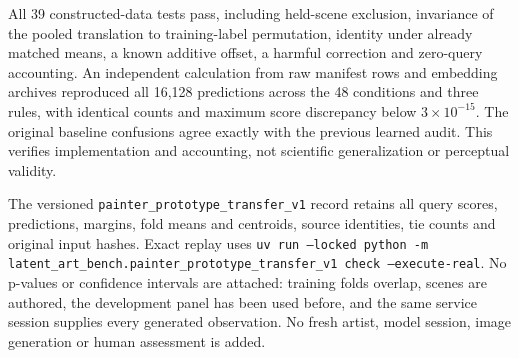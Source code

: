 All 39 constructed-data tests pass, including held-scene exclusion, invariance
of the pooled translation to training-label permutation, identity under
already matched means, a known additive offset, a harmful correction and
zero-query accounting. An independent calculation from raw manifest rows and
embedding archives reproduced all 16,128 predictions across the 48 conditions
and three rules, with identical counts and maximum score discrepancy below
$3\times10^{-15}$. The original baseline confusions agree exactly with the
previous learned audit. This verifies implementation and accounting, not
scientific generalization or perceptual validity.

The versioned \texttt{painter\_prototype\_transfer\_v1} record retains all query
scores, predictions, margins, fold means and centroids, source identities,
tie counts and original input hashes. Exact replay uses
\texttt{uv run --locked python -m
latent\_art\_bench.painter\_prototype\_transfer\_v1 check
--execute-real}. No p-values or confidence intervals are attached: training
folds overlap, scenes are authored, the development panel has been used
before, and the same service session supplies every generated observation.
No fresh artist, model session, image generation or human assessment is added.
